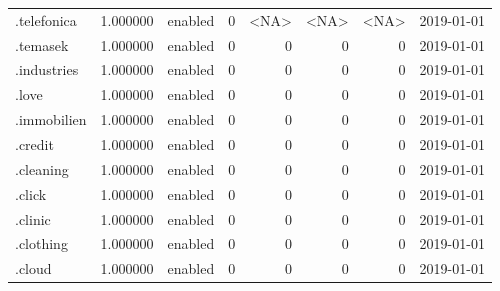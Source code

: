 \begin{tabular}{lrlrrrrl}
.telefonica               &          1.000000 &         enabled &                           0 &                        <NA> &                        <NA> &                <NA> &           2019-01-01 \\
.temasek                  &          1.000000 &         enabled &                           0 &                           0 &                           0 &                   0 &           2019-01-01 \\
.industries               &          1.000000 &         enabled &                           0 &                           0 &                           0 &                   0 &           2019-01-01 \\
.love                     &          1.000000 &         enabled &                           0 &                           0 &                           0 &                   0 &           2019-01-01 \\
.immobilien               &          1.000000 &         enabled &                           0 &                           0 &                           0 &                   0 &           2019-01-01 \\
.credit                   &          1.000000 &         enabled &                           0 &                           0 &                           0 &                   0 &           2019-01-01 \\
.cleaning                 &          1.000000 &         enabled &                           0 &                           0 &                           0 &                   0 &           2019-01-01 \\
.click                    &          1.000000 &         enabled &                           0 &                           0 &                           0 &                   0 &           2019-01-01 \\
.clinic                   &          1.000000 &         enabled &                           0 &                           0 &                           0 &                   0 &           2019-01-01 \\
.clothing                 &          1.000000 &         enabled &                           0 &                           0 &                           0 &                   0 &           2019-01-01 \\
.cloud                    &          1.000000 &         enabled &                           0 &                           0 &                           0 &                   0 &           2019-01-01 \\

\end{tabular}
